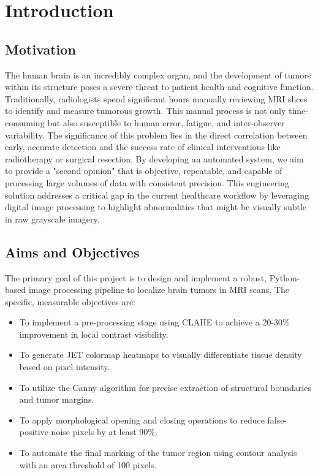 \documentclass[12pt,a4paper,oneside]{report}
\begin{document}
\newpage
\tableofcontents

\newpage
{}

\chapter{Introduction}
\section{Motivation}
The human brain is an incredibly complex organ, and the development of tumors within its structure poses a severe threat to patient health and cognitive function. Traditionally, radiologists spend significant hours manually reviewing MRI slices to identify and measure tumorous growth. This manual process is not only time-consuming but also susceptible to human error, fatigue, and inter-observer variability. The significance of this problem lies in the direct correlation between early, accurate detection and the success rate of clinical interventions like radiotherapy or surgical resection. By developing an automated system, we aim to provide a "second opinion" that is objective, repeatable, and capable of processing large volumes of data with consistent precision. This engineering solution addresses a critical gap in the current healthcare workflow by leveraging digital image processing to highlight abnormalities that might be visually subtle in raw grayscale imagery.

\section{Aims and Objectives}
The primary goal of this project is to design and implement a robust, Python-based image processing pipeline to localize brain tumors in MRI scans. The specific, measurable objectives are:
\begin{itemize}
    \item To implement a pre-processing stage using CLAHE to achieve a 20-30\% improvement in local contrast visibility.
    \item To generate JET colormap heatmaps to visually differentiate tissue density based on pixel intensity.
    \item To utilize the Canny algorithm for precise extraction of structural boundaries and tumor margins.
    \item To apply morphological opening and closing operations to reduce false-positive noise pixels by at least 90\%.
    \item To automate the final marking of the tumor region using contour analysis with an area threshold of 100 pixels.
\end{itemize}
\end{document}

